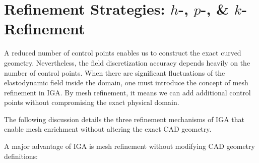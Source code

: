 \section{\texorpdfstring{Refinement Strategies: $h$-, $p$-, \& $k$-Refinement}{Refinement Strategies}}

A reduced number of control points enables us to construct the exact curved geometry. Nevertheless, the field discretization accuracy depends heavily on the number of control points. When there are significant fluctuations of the elastodynamic field inside the domain, one must introduce the concept of mesh refinement in IGA. By mesh refinement, it means we can add additional control points without compromising the exact physical domain. 

The following discussion details the three refinement mechanisms of IGA that enable mesh enrichment without altering the exact CAD geometry.

A major advantage of IGA is mesh refinement without modifying CAD geometry definitions:

\begin{table}[htbp]
    \centering
    \caption{Comparative synthesis of IGA refinement mechanisms.}
    \label{tab:refinement_comparison}
\end{table}

